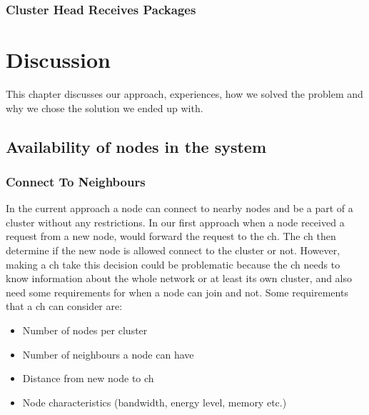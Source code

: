 \documentclass[USenglish]{uit-thesis}
\begin{document}
\subsection{Cluster Head Receives Packages}




\chapter{Discussion}

This chapter discusses our approach, experiences, how we solved the problem and why we chose the solution we ended up with.

\section{Availability of nodes in the system}

\subsection{Connect To Neighbours} \label{disc:conn_neighbours}


In the current approach a node can connect to nearby nodes and be a part of a cluster without any restrictions. In our first approach when a node received a request from a new node, would forward the request to the \gls{ch}. The \gls{ch} then determine if the new node is allowed connect to the cluster or not. However, making a \gls{ch} take this decision could be problematic because the \gls{ch} needs to know information about the whole network or at least its own cluster, and also need some requirements for when a node can join and not. Some requirements that a \gls{ch} can consider are:

\begin{itemize}
\item Number of nodes per cluster
\item Number of neighbours a node can have
\item Distance from new node to \gls{ch}
\item Node characteristics (bandwidth, energy level, memory etc.)
\end{itemize}
\end{document}

